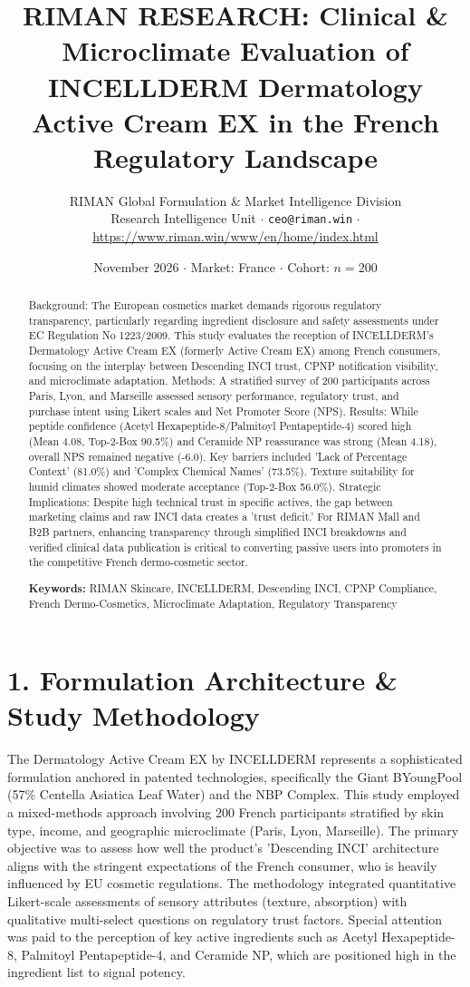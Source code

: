 \documentclass[10pt,twocolumn,a4paper]{article}
\title{\textbf{RIMAN RESEARCH: Clinical \& Microclimate Evaluation of INCELLDERM Dermatology Active Cream EX in the French Regulatory Landscape}}
\author{RIMAN Global Formulation \& Market Intelligence Division\\
\small Research Intelligence Unit $\cdot$ \texttt{ceo@riman.win} $\cdot$ \url{https://www.riman.win/www/en/home/index.html}}
\date{November 2026 \quad $\cdot$ \quad Market: France \quad $\cdot$ \quad Cohort: $n = 200$}
\begin{document}
\maketitle

\begin{abstract}
Background: The European cosmetics market demands rigorous regulatory transparency, particularly regarding ingredient disclosure and safety assessments under EC Regulation No 1223/2009. This study evaluates the reception of INCELLDERM's Dermatology Active Cream EX (formerly Active Cream EX) among French consumers, focusing on the interplay between Descending INCI trust, CPNP notification visibility, and microclimate adaptation. Methods: A stratified survey of 200 participants across Paris, Lyon, and Marseille assessed sensory performance, regulatory trust, and purchase intent using Likert scales and Net Promoter Score (NPS). Results: While peptide confidence (Acetyl Hexapeptide-8/Palmitoyl Pentapeptide-4) scored high (Mean 4.08, Top-2-Box 90.5\%) and Ceramide NP reassurance was strong (Mean 4.18), overall NPS remained negative (-6.0). Key barriers included 'Lack of Percentage Context' (81.0\%) and 'Complex Chemical Names' (73.5\%). Texture suitability for humid climates showed moderate acceptance (Top-2-Box 56.0\%). Strategic Implications: Despite high technical trust in specific actives, the gap between marketing claims and raw INCI data creates a 'trust deficit.' For RIMAN Mall and B2B partners, enhancing transparency through simplified INCI breakdowns and verified clinical data publication is critical to converting passive users into promoters in the competitive French dermo-cosmetic sector.

\vspace{0.4em}
\noindent\textbf{Keywords:} RIMAN Skincare, INCELLDERM, Descending INCI, CPNP Compliance, French Dermo-Cosmetics, Microclimate Adaptation, Regulatory Transparency
\end{abstract}

\section{1. Formulation Architecture \& Study Methodology}
The Dermatology Active Cream EX by INCELLDERM represents a sophisticated formulation anchored in patented technologies, specifically the Giant BYoungPool (57\% Centella Asiatica Leaf Water) and the NBP Complex. This study employed a mixed-methods approach involving 200 French participants stratified by skin type, income, and geographic microclimate (Paris, Lyon, Marseille). The primary objective was to assess how well the product's 'Descending INCI' architecture aligns with the stringent expectations of the French consumer, who is heavily influenced by EU cosmetic regulations. The methodology integrated quantitative Likert-scale assessments of sensory attributes (texture, absorption) with qualitative multi-select questions on regulatory trust factors. Special attention was paid to the perception of key active ingredients such as Acetyl Hexapeptide-8, Palmitoyl Pentapeptide-4, and Ceramide NP, which are positioned high in the ingredient list to signal potency.
\end{document}
